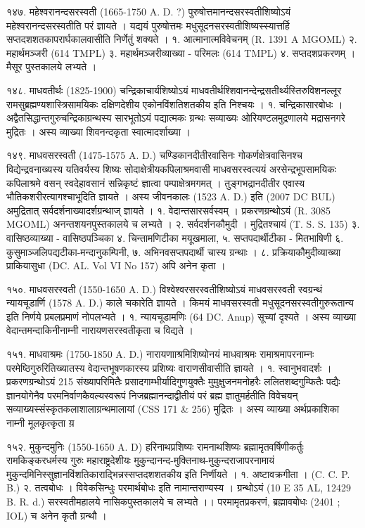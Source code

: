 १४७. महेश्वरानन्दसरस्वती (1665-1750 A. D. ?)
पुरुषोत्तमानन्दसरस्वतीशिष्योऽयं महेश्वरानन्दसरस्वतीति परं ज्ञायते । यद्ययं पुरुषोत्तमः मधुसूदनसरस्वतीशिष्यस्स्यात्तर्हि सप्तदशशतकापरार्घकालवासीति निर्णेतुं शक्यते ।
१. आत्मानात्मविवेचनम् (R. 1391 A MGOML)
२. महार्थमञ्जरी (614 TMPL)
३. महार्थमञ्जरीव्याख्या - परिमलः (614 TMPL)
४. सप्तदशप्रकरणम् । मैसूर पुस्तकालये लभ्यते ।

१४८. माधवतीर्थः (1825-1900)
चन्द्रिकाचार्यशिष्योऽयं माधवतीर्थश्शिवानन्देन्द्रसतीर्थ्यस्तिरुविशनल्लूर रामसुब्रह्मण्यशास्त्रिसामयिकः दक्षिणदेशीय एकोनविंशतिशतकीय इति निश्चयः ।
१. चन्द्रिकासारबोधः । अद्वैतसिद्धान्तगुरुचन्द्रिकाग्रन्थस्य सारभूतोऽयं पद्यात्मकः ग्रन्थः सव्याख्यः ओरियण्टलमुद्रणालये मद्रासनगरे मुद्रितः । अस्य व्याख्या शिवनन्दकृता स्वात्मादर्शाख्या ।

१४९. माधवसरस्वती (1475-1575 A. D.)
चण्डिकानदीतीरवासिनः गोकर्णक्षेत्रवासिनश्च विद्येन्द्रवनाख्यस्य यतिवर्यस्य शिष्यः सोदाक्षेत्रीयकपिलाश्रमवासी माधवसरस्वत्ययं अरसेन्द्रभूपसामयिकः कपिलाश्रमे वसन् स्वदेहावसानं सन्निकृष्टं ज्ञात्वा पम्पाक्षेत्रमगमत् । तुङ्गभद्रानदीतीर एवास्य भौतिकशरीरत्यागश्चाभूदिति ज्ञायते । अस्य जीवनकालः (1523 A. D.) इति (2007 DC BUL) अमुद्रितात् सर्वदर्शनाख्यादर्शग्रन्थाज् ज्ञायते ।
१. वेदान्तसारसर्वस्वम् । प्रकरणग्रन्थोऽयं (R. 3085 MGOML) अनन्तशयनपुस्तकालये च लभ्यते ।
२. सर्वदर्शनकौमुदी । मुद्रितश्चायं (T. S. S. 135)
३. वासिष्ठव्याख्या - वासिष्ठपञ्चिका
४. चिन्तामणिटीका मयूखमाला, 
५. सप्तपदार्थीटीका - मितभाषिणी
६. कुसुमाञ्जलिपद्यटीका-मन्दानुकम्पिनी,
७. अभिनवसप्तपदार्थी चास्य ग्रन्थाः ।
८. प्रक्रियाकौमुदीव्याख्या प्राकियासुधा (DC. AL. Vol VI No 157) अपि अनेन कृता ।

१५०. माधवसरस्वती (1550-1650 A. D.)
विश्वेश्वरसरस्वतीशिष्योऽयं माधवसरस्वती स्वग्रन्थं न्यायचूडार्णि (1578 A. D.) काले चकारेति ज्ञायते । किमयं माधवसरस्वती मधुसूदनसरस्वतीगुरुरूतान्य इति निर्णये प्रबलप्रमाणं नोपलभ्यते ।
१. न्यायचूडामणिः (64 DC. Anup) सूच्यां दृश्यते । अस्य व्याख्या वेदान्तमन्दाकिनीनाम्नी नारायणसरस्वतीकृता च विद्यते ।

१५१. माधवाश्रमः (1750-1850 A. D.)
नारायणााश्रमिशिष्योनयं माधवाश्रमः रामाश्रमापरनाम्नः परमेष्ठिगुरुरितिख्यातस्य वेदान्तभूषणकारस्य प्रशिष्यः वाराणसीवासीति ज्ञायते ।
१. स्वानुभवादर्शः । प्रकरणग्रन्थोऽयं 215 संख्यापरिमितैः प्रसादगाम्भीर्यादिगुणयुक्तैः मुमुक्षुजनमनोहरैः ललितशब्दगुम्फितैः पद्यैः ज्ञानयोगेनैव परमनिर्वाणकैवल्यस्वरूपं निजब्रह्मानन्दाद्वीतीयं परं ब्रह्म ज्ञातुमर्हतीति विवेचयन् सव्याख्यस्संस्कृतकलाशालाग्रन्थमालायां (CSS 171 & 256) मुद्रितः । अस्य व्याख्या अर्थप्रकाशिका नाम्नी मूलकृत्कृता य़

१५२. मुकुन्दमुनिः (1550-1650 A. D)
हरिनाथप्रशिष्यः रामनाथशिष्यः ब्रह्मामृतवर्षिणीकर्तुः रामकिङ्करधर्मस्य गुरुः महाराष्ट्रदेशीयः मुकुन्दानन्द-मुक्तिनाथ-मुकुन्दराजापरनामायं मुकुन्दमिनिस्सुज्ञानविंशतिकाराद्भिन्नस्सप्तदशशतकीय इति निर्णीयते ।
१. अष्टावक्रगीता । (C. C. P. B.)
२. तत्वबोधः । विवेकसिन्धुः परमार्थबोधः इति नामान्तराण्यस्य । ग्रन्थोऽयं (10 E 35 AL, 12429 B. R. d.) सरस्वतीमहालये नासिकपुस्तकालये च लभ्यते ।। परमामृतप्रकरणं, ब्रह्मावबोधः (2401 ; IOL) च अनेन कृतौ ग्रन्थौ ।

